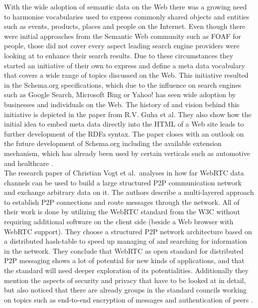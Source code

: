 With the wide adoption of semantic data on the Web there was a growing need to harmonise vocabularies used to express commonly shared objects and entities such as events, products, places and people on the Internet. Even though there were initial approaches from the Semantic Web community such as \gls{FOAF} for people, those did not cover every aspect leading search engine providers were looking at to enhance their search results. Due to these circumstances they started an initiative of their own to express and define a meta data vocabulary that covers a wide range of topics discussed on the Web. This initiative resulted in the Schema.org specifications, which due to the influence on search engines such as Google Search, Microsoft Bing or Yahoo! has seen wide adoption by businesses and individuals on the Web. The history of and vision behind this initiative is depicted in the paper from R.V. Guha et al. They also show how the initial idea to embed meta data directly into the \gls{HTML} of a Web site leads to further development of the \gls{RDFa} syntax. The paper closes with an outlook on the future development of Schema.org including the available extension mechanism, which has already been used by certain verticals such as automotive and healthcare \citep{guha2016schema}. \\

The research paper of Christian Vogt et al.\ analyses in how far \gls{WebRTC} data channels can be used to build a large structured \gls{P2P} communication network and exchange arbitrary data on it. The authors describe a multi-layered approach to establish \gls{P2P} connections and route messages through the network. All of their work is done by utilizing the \gls{WebRTC} standard from the \gls{W3C} without requiring additional software on the client side (beside a Web browser with \gls{WebRTC} support). They choose a structured \gls{P2P} network architecture based on a distributed hash-table to speed up managing of and searching for information in the network. They conclude that \gls{WebRTC} as open standard for distributed \gls{P2P} messaging shows a lot of potential for new kinds of applications, and that the standard will need deeper exploration of its potentialities. Additionally they mention the aspects of security and privacy that have to be looked at in detail, but also noticed that there are already groups in the standard councils working on topics such as end-to-end encryption of messages and authentication of peers \citep{vogt2013leveraging}. \\

